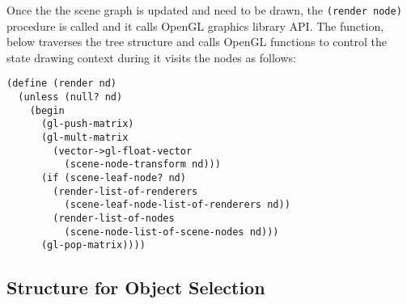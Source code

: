 \documentclass[preprint,nocopyrightspace]{sigplanconf}
\begin{document}
Once the the scene graph is updated and need to be drawn, the {\tt (render node)} procedure is called and it calls OpenGL graphics library API. The function, below traverses the tree structure and calls OpenGL functions to control the state drawing context during it visits the nodes as follows:
\begin{verbatim}
(define (render nd)
  (unless (null? nd)
    (begin
      (gl-push-matrix)
      (gl-mult-matrix 
        (vector->gl-float-vector 
          (scene-node-transform nd)))
      (if (scene-leaf-node? nd)
        (render-list-of-renderers 
          (scene-leaf-node-list-of-renderers nd))
        (render-list-of-nodes 
          (scene-node-list-of-scene-nodes nd)))
      (gl-pop-matrix))))
\end{verbatim}

\subsection{Structure for Object Selection}
\label{STR_SLN}
\end{document}
